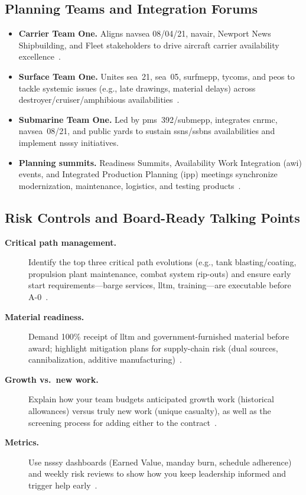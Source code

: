 \documentclass[../main.tex]{subfiles}
\begin{document}
\subsection{Planning Teams and Integration Forums}
\begin{itemize}
  \item \textbf{Carrier Team One.} Aligns \ac{navsea} 08/04/21, \ac{navair}, Newport News Shipbuilding, and Fleet stakeholders to drive aircraft carrier availability excellence~\autocite{edo-4-2-1-cno-availability-planning-2025}.
  \item \textbf{Surface Team One.} Unites \ac{sea}~21, \ac{sea}~05, \ac{surfmepp}, \acp{tycom}, and \acp{peo} to tackle systemic issues (e.g., late drawings, material delays) across destroyer/cruiser/amphibious availabilities~\autocite{edo-4-2-1-cno-availability-planning-2025}.
  \item \textbf{Submarine Team One.} Led by \ac{pms}~392/\ac{submepp}, integrates \ac{cnrmc}, \ac{navsea}~08/21, and public yards to sustain \acp{ssn}/\acp{ssbn} availabilities and implement \ac{nsssy} initiatives\autocite{edo-4-2-1-cno-availability-planning-2025}.
  \item \textbf{Planning summits.} Readiness Summits, Availability Work Integration (\ac{awi}) events, and Integrated Production Planning (\ac{ipp}) meetings synchronize modernization, maintenance, logistics, and testing products~\autocite{edo-4-2-1-cno-availability-planning-2025}.
\end{itemize}

\subsection{Risk Controls and Board-Ready Talking Points}
\begin{description}
  \item[\textbf{Critical path management.}] Identify the top three critical path evolutions (e.g., tank blasting/coating, propulsion plant maintenance, combat system rip-outs) and ensure early start requirements—barge services, \ac{lltm}, training—are executable before A-0~\autocite{edo-4-2-1-cno-availability-planning-2025}.
  \item[\textbf{Material readiness.}] Demand 100\% receipt of \ac{lltm} and government-furnished material before award; highlight mitigation plans for supply-chain risk (dual sources, cannibalization, additive manufacturing)~\autocite{edo-4-2-1-cno-availability-planning-2025}.
  \item[\textbf{Growth vs.\ new work.}] Explain how your team budgets anticipated growth work (historical allowances) versus truly new work (unique casualty), as well as the screening process for adding either to the contract~\autocite{COMFLTFORCOMINST4790-3}.
  \item[\textbf{Metrics.}] Use \ac{nsssy} dashboards (Earned Value, manday burn, schedule adherence) and weekly risk reviews to show how you keep leadership informed and trigger help early~\autocite{edo-4-2-1-cno-availability-planning-2025}.
\end{description}

\end{document}
